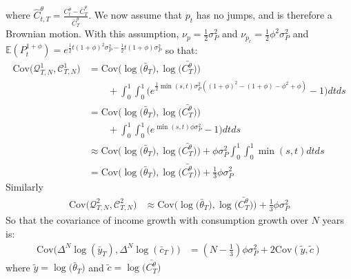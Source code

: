 where $\hat{C}^{\theta}_{t,T} = \frac{C^{\theta}_t-\bar{C}^{\theta}_T}{\bar{C}^{\theta}_T}$. We now assume that $p_t$ has no jumps, and is therefore a Brownian motion. With this assumption, $\nu_p = \frac{1}{2}\sigma^2_P$ and $\nu_{p_c}= \frac{1}{2}\phi^2\sigma^2_P$ and $\mathbb{E}(P^{1+\phi}_t) = e^{\frac{1}{2}t(1+\phi)^2\sigma^2_P - \frac{1}{2}t(1+\phi)\sigma^2_P}$ so that:
\begin{align*}
\mathrm{Cov}\Big(\mathcal{Q}^1_{T,N},\mathcal{C}^1_{T,N} \Big) 
&= \mathrm{Cov}\Big( \log \Big( \bar{\theta}_T \Big), \log \Big( \bar{C^{\theta}_T} \Big) \Big) \\
& \qquad +  \int_{0}^{1} \int_{0}^{1} \Big(e^{\frac{1}{2}\min(s,t)\sigma^2_P((1+\phi)^2 -(1+\phi) - \phi^2 +\phi  )}-1\Big) dt ds \\
&= \mathrm{Cov}\Big( \log \Big( \bar{\theta}_T \Big), \log \Big( \bar{C^{\theta}_T} \Big) \Big) \\
& \qquad +  \int_{0}^{1} \int_{0}^{1} \Big(e^{\min(s,t)\phi\sigma^2_P}-1\Big) dt ds \\
&\approx \mathrm{Cov}\Big( \log \Big( \bar{\theta}_T \Big), \log \Big( \bar{C^{\theta}_T} \Big) \Big)  +  \phi\sigma^2_P \int_{0}^{1} \int_{0}^{1} \min(s,t)dt ds \\
&=\mathrm{Cov}\Big( \log \Big( \bar{\theta}_T \Big), \log \Big( \bar{C^{\theta}_T} \Big) \Big)  +  \frac{1}{3}\phi\sigma^2_P 
\end{align*}
Similarly
\begin{align*}
\mathrm{Cov}\Big(\mathcal{Q}^2_{T,N},\mathcal{C}^2_{T,N} \Big) 
&\approx \mathrm{Cov}\Big( \log \Big( \bar{\theta}_T \Big), \log \Big( \bar{C^{\theta}_T} \Big) \Big)  +  \frac{1}{3}\phi\sigma^2_P 
\end{align*}
So that the covariance of income growth with consumption growth over $N$ years is:
\begin{align*}
\mathrm{Cov}\Big(\Delta^N\log(\bar{y}_T), \Delta^N\log(\bar{c}_T)\Big) 
&= (N-\frac{1}{3})\phi \sigma^2_P + 2 \mathrm{Cov}(\tilde{y},\tilde{c})
\end{align*}
where $\tilde{y} = \log \Big( \bar{\theta}_T \Big)$ and $\tilde{c} =\log \Big( \bar{C^{\theta}_T} \Big) $

